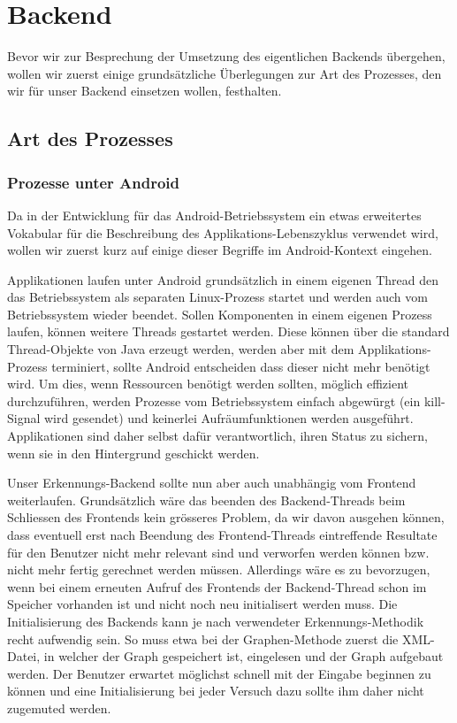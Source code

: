 \chapter{Backend}

Bevor wir zur Besprechung der Umsetzung des eigentlichen Backends übergehen, wollen wir zuerst einige grundsätzliche Überlegungen zur Art des Prozesses, den wir für unser Backend einsetzen wollen, festhalten.

\section{Art des Prozesses}

\subsection{Prozesse unter Android}

Da in der Entwicklung für das Android-Betriebssystem ein etwas erweitertes Vokabular für die Beschreibung des Applikations-Lebenszyklus verwendet wird, wollen wir zuerst kurz auf einige dieser Begriffe im Android-Kontext eingehen.

Applikationen laufen unter Android grundsätzlich in einem eigenen Thread den das Betriebssystem als separaten Linux-Prozess startet und werden auch vom Betriebssystem wieder beendet. Sollen Komponenten in einem eigenen Prozess laufen, können weitere Threads gestartet werden\cite{adglc}. Diese können über die standard Thread-Objekte von Java erzeugt werden, werden aber mit dem Applikations-Prozess terminiert, sollte Android entscheiden dass dieser nicht mehr benötigt wird. Um dies, wenn Ressourcen benötigt werden sollten, möglich effizient durchzuführen, werden Prozesse vom Betriebssystem einfach abgewürgt (ein kill-Signal wird gesendet) und keinerlei Aufräumfunktionen werden ausgeführt. Applikationen sind daher selbst dafür verantwortlich, ihren Status zu sichern, wenn sie in den Hintergrund geschickt werden\cite{adbmt}.

Unser Erkennungs-Backend sollte nun aber auch unabhängig vom Frontend weiterlaufen. Grundsätzlich wäre das beenden des Backend-Threads beim Schliessen des Frontends kein grösseres Problem, da wir davon ausgehen können, dass eventuell erst nach Beendung des Frontend-Threads eintreffende Resultate für den Benutzer nicht mehr relevant sind und verworfen werden können bzw. nicht mehr fertig gerechnet werden müssen. Allerdings wäre es zu bevorzugen, wenn bei einem erneuten Aufruf des Frontends der Backend-Thread schon im Speicher vorhanden ist und nicht noch neu initialisert werden muss. Die Initialisierung des Backends kann je nach verwendeter Erkennungs-Methodik recht aufwendig sein. So muss etwa bei der Graphen-Methode zuerst die XML-Datei, in welcher der Graph gespeichert ist, eingelesen und der Graph aufgebaut werden. Der Benutzer erwartet möglichst schnell mit der Eingabe beginnen zu können und eine Initialisierung bei jeder Versuch dazu sollte ihm daher nicht zugemuted werden.

